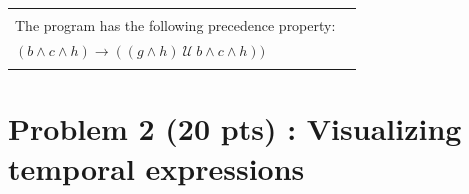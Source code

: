 \documentclass[12pt]{article}
\begin{document}
\begin{enumerate}
\begin{table}
\begin{tabular}{|l|l|}
&\\

\hline

&\\
		
The program has the following precedence property: &\\
$(b \wedge c \wedge h) \rightarrow ( (g \wedge h) ~\mathcal{U}~ b \wedge c \wedge h))$
			 &\\
&\\

\hline

\end{tabular}
\end{table}


\end{enumerate}


\newpage

\section*{Problem 2 (20 pts) :  Visualizing temporal expressions}
\end{document}
